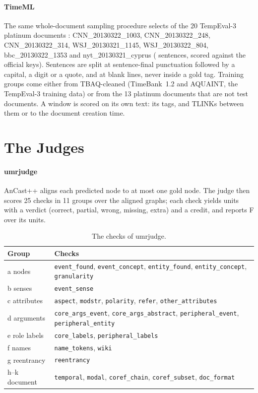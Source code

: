 \paragraph{TimeML} The same whole-document sampling procedure selects \nTestDocsTml{} of the 20 TempEval-3 platinum documents \citep{uzzaman2013semeval}: CNN\_20130322\_1003, CNN\_20130322\_248, CNN\_20130322\_314, WSJ\_20130321\_1145, WSJ\_20130322\_804, bbc\_20130322\_1353 and nyt\_20130321\_cyprus (\nTestTml{} sentences, scored against the official keys). Sentences are split at sentence-final punctuation followed by a capital, a digit or a quote, and at blank lines, never inside a gold tag. Training groups come either from TBAQ-cleaned (TimeBank~1.2 \citep{pustejovsky2006timebank} and AQUAINT, the TempEval-3 training data) or from the 13 platinum documents that are not test documents. A window is scored on its own text: its tags, and TLINKs between them or to the document creation time.

\section{The Judges}
\label{app:judge}

\paragraph{umrjudge} AnCast++ aligns each predicted node to at most one gold node. The judge then scores 25 checks in 11 groups over the aligned graphs; each check yields units with a verdict (correct, partial, wrong, missing, extra) and a credit, and reports F over its units.

\begin{table}[h]
\centering\scriptsize
\setlength{\tabcolsep}{3pt}
\begin{tabular}{@{}lp{}@{}}
\toprule
Group & Checks \\
\midrule
a nodes & \texttt{event\_found}, \texttt{event\_concept}, \texttt{entity\_found}, \texttt{entity\_concept}, \texttt{granularity} \\
b senses & \texttt{event\_sense} \\
c attributes & \texttt{aspect}, \texttt{modstr}, \texttt{polarity}, \texttt{refer}, \texttt{other\_attributes} \\
d arguments & \texttt{core\_args\_event}, \texttt{core\_args\_abstract}, \texttt{peripheral\_event}, \texttt{peripheral\_entity} \\
e role labels & \texttt{core\_labels}, \texttt{peripheral\_labels} \\
f names & \texttt{name\_tokens}, \texttt{wiki} \\
g reentrancy & \texttt{reentrancy} \\
h--k document & \texttt{temporal}, \texttt{modal}, \texttt{coref\_chain}, \texttt{coref\_subset}, \texttt{doc\_format} \\
\bottomrule
\end{tabular}
\caption{The checks of umrjudge.}
\label{tab:judge}
\end{table}

